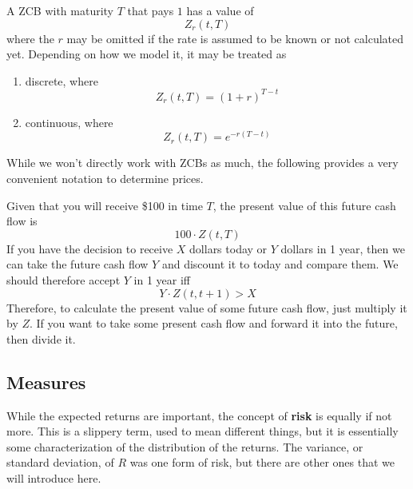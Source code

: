 \documentclass{article}
\begin{document}
    \begin{definition}[ZCB]
      A ZCB with maturity $T$ that pays $1$ has a value of 
      \begin{equation}
        Z_r (t, T) 
      \end{equation}
      where the $r$ may be omitted if the rate is assumed to be known or not calculated yet. Depending on how we model it, it may be treated as 
      \begin{enumerate}
        \item discrete, where 
          \begin{equation}
            Z_r (t, T) = (1 + r)^{T - t}
          \end{equation}
        \item continuous, where 
          \begin{equation}
            Z_r (t, T) = e^{- r (T - t)}
          \end{equation}
      \end{enumerate}
    \end{definition}

    While we won't directly work with ZCBs as much, the following provides a very convenient notation to determine prices. 

    \begin{example}
      Given that you will receive \$100 in time $T$, the present value of this future cash flow is 
      \begin{equation}
        100 \cdot Z(t, T)
      \end{equation}
      If you have the decision to receive $X$ dollars today or $Y$ dollars in 1 year, then we can take the future cash flow $Y$ and discount it to today and compare them. We should therefore accept $Y$ in 1 year iff 
      \begin{equation}
        Y \cdot Z(t, t + 1) > X  
      \end{equation}
      Therefore, to calculate the present value of some future cash flow, just multiply it by $Z$. If you want to take some present cash flow and forward it into the future, then divide it. 
    \end{example}

  \subsection{Measures}

    While the expected returns are important, the concept of \textbf{risk} is equally if not more. This is a slippery term, used to mean different things, but it is essentially some characterization of the distribution of the returns. The variance, or standard deviation, of $R$ was one form of risk, but there are other ones that we will introduce here. 
\end{document}
